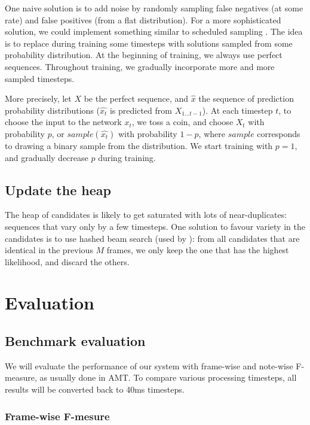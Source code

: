 \documentclass{article}
\begin{document}
One naive solution is to add noise by randomly sampling false negatives (at some rate) and false positives (from a flat distribution).
For a more sophisticated solution, we could implement something similar to scheduled sampling  \citep{Bengio2015}.
The idea is to replace during training some timesteps with solutions sampled from some probability distribution.
At the beginning of training, we always use perfect sequences.
Throughout training, we gradually incorporate more and more sampled timesteps.

More precisely, let $X$ be the perfect sequence, and $\hat{x}$ the sequence of prediction probability distributions
($\hat{x_t}$ is predicted from $X_{1...t-1}$).
At each timestep $t$, to choose the input to the network $x_t$, we toss a coin,
and choose $X_t$ with probability $p$, or $sample(\hat{x_t})$ with probability $1-p$, where $sample$ corresponds to drawing a binary sample from the distribution.
We start training with $p=1$, and gradually decrease $p$ during training.



\subsection{Update the heap}
\label{sec:update}

The heap of candidates is likely to get saturated with lots of near-duplicates: sequences that vary only by a few timesteps.
One solution to favour variety in the candidates is to use hashed beam search (used by \citep{Korzeniowski2018}):
from all candidates that are identical in the previous $M$ frames, we only keep the one that has the highest likelihood, and discard the others.


\section{Evaluation}

\subsection{Benchmark evaluation}

We will evaluate the performance of our system with frame-wise and note-wise F-measure, as usually done in AMT.
To compare various processing timesteps, all results will be converted back to 40ms timesteps.

\subsubsection{Frame-wise F-mesure}
\end{document}
